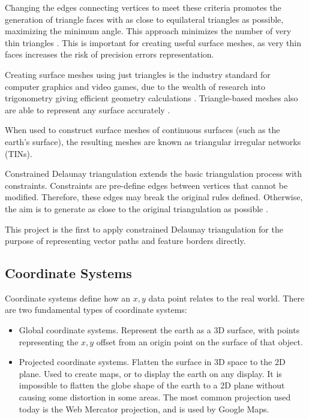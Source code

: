 \documentclass[12pt]{article}
\begin{document}
Changing the edges connecting vertices to meet these criteria promotes the generation of triangle faces with as close to equilateral triangles as possible, maximizing the minimum angle. This approach minimizes the number of very thin triangles \autocite{preparata2012computational}. This is important for creating useful surface meshes, as very thin faces increases the risk of precision errors  representation.

Creating surface meshes using just triangles is the industry standard for computer graphics and video games, due to the wealth of research into trigonometry giving efficient geometry calculations \autocite{marschner2018graphics}. Triangle-based meshes also are able to represent any surface accurately \autocite{perkins2013fielddstar}.

When used to construct surface meshes of continuous surfaces (such as the earth's surface), the resulting meshes are known as triangular irregular networks (TINs).


Constrained Delaunay triangulation extends the basic triangulation process with constraints. Constraints are pre-define edges between vertices that cannot be modified. Therefore, these edges may break the original rules defined. Otherwise, the aim is to generate as close to the original triangulation as possible \autocite{chew1987constraints}.

This project is the first to apply constrained Delaunay triangulation for the purpose of representing vector paths and feature borders directly.

\subsection{Coordinate Systems}

Coordinate systems define how an $x,y$ data point relates to the real world. There are two fundamental types of coordinate systems:

\begin{itemize}
  \item Global coordinate systems. Represent the earth as a 3D surface, with points representing the $x,y$ offset from an origin point on the surface of that object.
  \item Projected coordinate systems. Flatten the surface in 3D space to the 2D plane. Used to create maps, or to display the earth on any display. It is impossible to flatten the globe shape of the earth to a 2D plane without causing some distortion in some areas. The most common projection used today is the Web Mercator projection, and is used by Google Maps.
\end{itemize}
\end{document}
